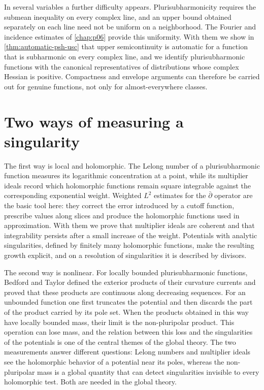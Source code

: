 In several variables a further difficulty appears. Plurisubharmonicity requires the submean inequality on every complex line, and an upper bound obtained separately on each line need not be uniform on a neighborhood. The Fourier and incidence estimates of \cref{chap:p06} provide this uniformity. With them we show in \cref{thm:automatic-psh-usc} that upper semicontinuity is automatic for a function that is subharmonic on every complex line, and we identify plurisubharmonic functions with the canonical representatives of distributions whose complex Hessian is positive. Compactness and envelope arguments can therefore be carried out for genuine functions, not only for almost-everywhere classes.

\section*{Two ways of measuring a singularity}
The first way is local and holomorphic. The Lelong number of a plurisubharmonic function measures its logarithmic concentration at a point, while its multiplier ideals record which holomorphic functions remain square integrable against the corresponding exponential weight. Weighted $L^2$ estimates for the $\bar\partial$ operator are the basic tool here: they correct the error introduced by a cutoff function, prescribe values along slices and produce the holomorphic functions used in approximation. With them we prove that multiplier ideals are coherent and that integrability persists after a small increase of the weight. Potentials with analytic singularities, defined by finitely many holomorphic functions, make the resulting growth explicit, and on a resolution of singularities it is described by divisors.

The second way is nonlinear. For locally bounded plurisubharmonic functions, Bedford and Taylor defined the exterior products of their curvature currents and proved that these products are continuous along decreasing sequences. For an unbounded function one first truncates the potential and then discards the part of the product carried by its pole set. When the products obtained in this way have locally bounded mass, their limit is the non-pluripolar product. This operation can lose mass, and the relation between this loss and the singularities of the potentials is one of the central themes of the global theory. The two measurements answer different questions: Lelong numbers and multiplier ideals see the holomorphic behavior of a potential near its poles, whereas the non-pluripolar mass is a global quantity that can detect singularities invisible to every holomorphic test. Both are needed in the global theory.

